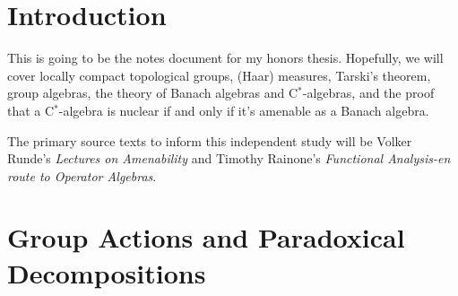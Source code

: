 \documentclass[10pt]{mypackage}
\begin{document}
\section{Introduction}%
This is going to be the notes document for my honors thesis. Hopefully, we will cover locally compact topological groups, (Haar) measures, Tarski's theorem, group algebras, the theory of Banach algebras and C$^{\ast}$-algebras, and the proof that a C$^{\ast}$-algebra is nuclear if and only if it's amenable as a Banach algebra.\newline

The primary source texts to inform this independent study will be Volker Runde's \textit{Lectures on Amenability} and Timothy Rainone's \textit{Functional Analysis-en route to Operator Algebras}.
\section{Group Actions and Paradoxical Decompositions}%
\end{document}

